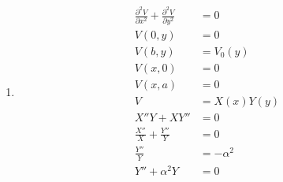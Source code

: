 \documentclass{article}
\begin{document}
\subsection{}

\begin{enumerate}
  \item

        \begin{align*}
          \frac{\partial^2 V}{\partial x^2} + \frac{\partial^2 V}{\partial y^2} & = 0                                                                          \\
          V(0, y)                                                               & = 0                                                                          \\
          V(b, y)                                                               & = V_0(y)                                                                     \\
          V(x, 0)                                                               & = 0                                                                          \\
          V(x, a)                                                               & = 0                                                                          \\
          V                                                                     & = X(x) Y(y)                                                                  \\
          X'' Y + X Y''                                                         & = 0                                                                          \\
          \frac{X''}{X} + \frac{Y''}{Y}                                         & = 0                                                                          \\
          \frac{Y''}{Y}                                                         & = -\alpha^2                                                                  \\
          Y'' + \alpha^2 Y                                                      & = 0                                                                          \\

\end{align*}
\end{enumerate}
\end{document}
